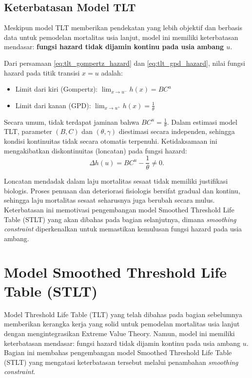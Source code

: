 \subsection{Keterbatasan Model TLT}

Meskipun model TLT memberikan pendekatan yang lebih objektif dan berbasis data untuk pemodelan mortalitas usia lanjut, model ini memiliki keterbatasan mendasar: \textbf{fungsi hazard tidak dijamin kontinu pada usia ambang $u$}.

Dari persamaan \eqref{eq:tlt_gompertz_hazard} dan \eqref{eq:tlt_gpd_hazard}, nilai fungsi hazard pada titik transisi $x = u$ adalah:
\begin{itemize}
    \item Limit dari kiri (Gompertz): $\lim_{x \to u^-} h(x) = BC^u$
    \item Limit dari kanan (GPD): $\lim_{x \to u^+} h(x) = \frac{1}{\theta}$
\end{itemize}

Secara umum, tidak terdapat jaminan bahwa $BC^u = \frac{1}{\theta}$. Dalam estimasi model TLT, parameter $(B, C)$ dan $(\theta, \gamma)$ diestimasi secara independen, sehingga kondisi kontinuitas tidak secara otomatis terpenuhi. Ketidaksamaan ini mengakibatkan diskontinuitas (loncatan) pada fungsi hazard:
\begin{equation}
\Delta h(u) = BC^u - \frac{1}{\theta} \neq 0.
\label{eq:hazard_jump}
\end{equation}

Loncatan mendadak dalam laju mortalitas sesaat tidak memiliki justifikasi biologis. Proses penuaan dan deteriorasi fisiologis bersifat gradual dan kontinu, sehingga laju mortalitas sesaat seharusnya juga berubah secara mulus. Keterbatasan ini memotivasi pengembangan model Smoothed Threshold Life Table (STLT) yang akan dibahas pada bagian selanjutnya, dimana \textit{smoothing constraint} diperkenalkan untuk memastikan kemulusan fungsi hazard pada usia ambang.
\section{Model Smoothed Threshold Life Table (STLT)}

Model Threshold Life Table (TLT) yang telah dibahas pada bagian sebelumnya memberikan kerangka kerja yang solid untuk pemodelan mortalitas usia lanjut dengan mengintegrasikan Extreme Value Theory. Namun, model ini memiliki keterbatasan mendasar: fungsi hazard tidak dijamin kontinu pada usia ambang $u$. Bagian ini membahas pengembangan model Smoothed Threshold Life Table (STLT) yang mengatasi keterbatasan tersebut melalui penambahan \textit{smoothing constraint}.

